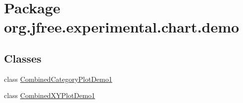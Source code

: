 \hypertarget{namespaceorg_1_1jfree_1_1experimental_1_1chart_1_1demo}{}\section{Package org.\+jfree.\+experimental.\+chart.\+demo}
\label{namespaceorg_1_1jfree_1_1experimental_1_1chart_1_1demo}
\subsection*{Classes}
\begin{DoxyCompactItemize}
\item 
class \mbox{\hyperlink{classorg_1_1jfree_1_1experimental_1_1chart_1_1demo_1_1_combined_category_plot_demo1}{Combined\+Category\+Plot\+Demo1}}
\item 
class \mbox{\hyperlink{classorg_1_1jfree_1_1experimental_1_1chart_1_1demo_1_1_combined_x_y_plot_demo1}{Combined\+X\+Y\+Plot\+Demo1}}
\end{DoxyCompactItemize}

